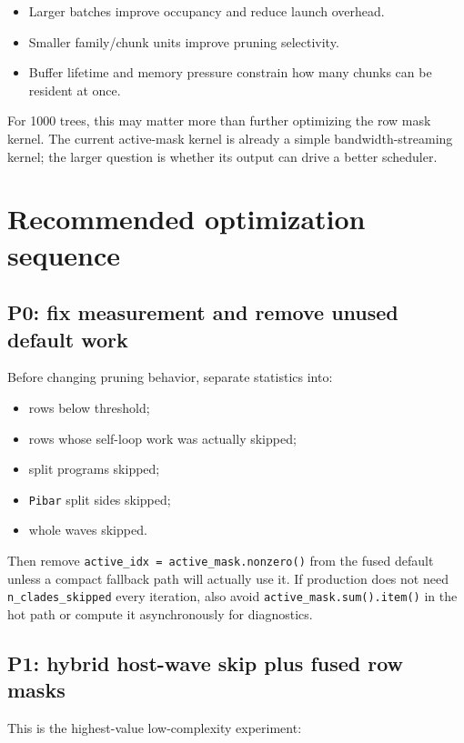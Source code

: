 \documentclass[11pt]{article}
\newcommand{\code}[1]{\texttt{#1}}
\begin{document}
\begin{itemize}[leftmargin=*]
\item Larger batches improve occupancy and reduce launch overhead.
\item Smaller family/chunk units improve pruning selectivity.
\item Buffer lifetime and memory pressure constrain how many chunks can be
      resident at once.
\end{itemize}

For 1000 trees, this may matter more than further optimizing the row mask
kernel.  The current active-mask kernel is already a simple bandwidth-streaming
kernel; the larger question is whether its output can drive a better scheduler.

\section{Recommended optimization sequence}

\subsection{P0: fix measurement and remove unused default work}

Before changing pruning behavior, separate statistics into:

\begin{itemize}[leftmargin=*]
\item rows below threshold;
\item rows whose self-loop work was actually skipped;
\item split programs skipped;
\item \code{Pibar} split sides skipped;
\item whole waves skipped.
\end{itemize}

Then remove \code{active\_idx = active\_mask.nonzero()} from the fused default
unless a compact fallback path will actually use it.  If production does not
need \code{n\_clades\_skipped} every iteration, also avoid
\code{active\_mask.sum().item()} in the hot path or compute it asynchronously
for diagnostics.

\subsection{P1: hybrid host-wave skip plus fused row masks}

This is the highest-value low-complexity experiment:
\end{document}
